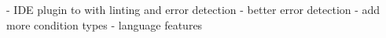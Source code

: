 


- IDE plugin to with linting and error detection
- better error detection
- add more condition types
- language features
